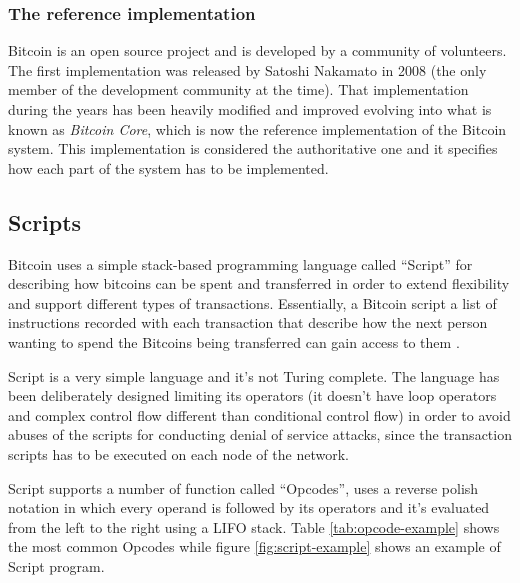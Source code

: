 \subsubsection*{The reference implementation}
Bitcoin is an open source project and is developed by a community of volunteers.
The first implementation was released by Satoshi Nakamato in 2008 (the only member
of the development community at the time). That implementation during the years
has been heavily modified and improved evolving into what is known as \emph{Bitcoin
Core}, which is now the reference implementation of the Bitcoin system. This
implementation is considered the authoritative one and it specifies how each
part of the system has to be implemented.










\subsection{Scripts} \label{sec:scripts}Bitcoin uses a simple stack-based
programming language called ``Script'' for describing how bitcoins can be spent
and transferred in order to extend flexibility and support different types of
transactions. Essentially, a Bitcoin script a list of instructions recorded with
each transaction that describe how the next person wanting to spend the Bitcoins
being transferred can gain access to them \cite{script-bitcoin-wiki}.

Script is a very simple language and it's not Turing complete. The language has
been deliberately designed limiting its operators (it doesn't have loop operators
and complex control flow different than conditional control flow) in order to
avoid abuses of the scripts for conducting denial of service attacks, since the
transaction scripts has to be executed on each node of the network.

Script supports a number of function called ``Opcodes'', uses a reverse polish
notation in which every operand is followed by its operators and it's evaluated
from the left to the right using a LIFO stack. Table \ref{tab:opcode-example} shows the most common
Opcodes while figure \ref{fig:script-example} shows an example of Script program.



